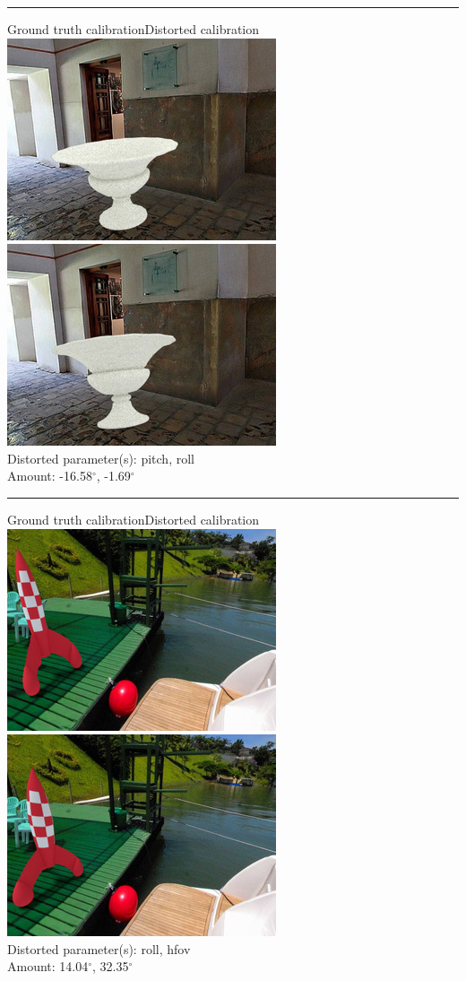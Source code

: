 \begin{minipage}{\linewidth}
\centering
\hrule\vspace{1em}
Ground truth calibration\hspace{0.2\linewidth}Distorted calibration\
\includegraphics[width=0.45\linewidth]{study/thumb/pano_ahxngimugqzaln-1_7_gt.jpg}
\includegraphics[width=0.45\linewidth]{study/thumb/pano_ahxngimugqzaln-1_7_dc.jpg}\\
Distorted parameter(s): pitch, roll\\
Amount: -16.58$^\circ$, -1.69$^\circ$
\end{minipage}

\begin{minipage}{\linewidth}
\centering
\hrule\vspace{1em}
Ground truth calibration\hspace{0.2\linewidth}Distorted calibration\
\includegraphics[width=0.45\linewidth]{study/thumb/pano_ahxngxlbcrplaw-6_0_gt.jpg}
\includegraphics[width=0.45\linewidth]{study/thumb/pano_ahxngxlbcrplaw-6_0_dc.jpg}\\
Distorted parameter(s): roll, hfov\\
Amount: 14.04$^\circ$, 32.35$^\circ$
\end{minipage}

